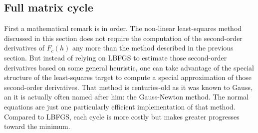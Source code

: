 \documentclass[12pt]{article}
\begin{document}
 \subsection{Full matrix cycle}
 
 First a mathematical remark is in order. The non-linear least-squares method discussed in this section does not require the computation of the second-order derivatives of $F_c(h)$ any more than the method described in the previous section. But instead of relying on LBFGS to estimate those second-order derivatives based on some general heuristic, one can take advantage of the special structure of the least-squares target to compute a special approximation of those second-order derivatives. That method is centuries-old as it was known to Gauss, an it is actually often named after him: the Gauss-Newton method. The normal equations are just one particularly efficient implementation of that method. Compared to LBFGS, each cycle is more costly but makes greater progresses toward the minimum.
 
\end{document}
